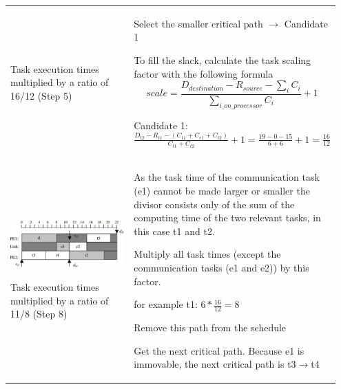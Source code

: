 \begin{longtable}{p{0.4\linewidth}p{0.55\linewidth}}
				Task execution times multiplied by a ratio of 16/12 (Step 5)			
			&
				\begin{compactenum}	
					\setcounter{enumi}{2}
					\item Select the smaller critical path $\rightarrow$ Candidate 1
					\item To fill the slack, calculate the task scaling factor with the following formula 
					\begin{equation*}
						scale=\frac{D_{destination}-R_{source}-\sum_{i}C_i}{\sum_{i\_on\_processor}C_i}+1
					\end{equation*}
					\begin{compactitem}
						\item Candidate 1: $\frac{D_{t2}-R_{t1}-(C_{t1}+C_{e1}+C_{t2})}{C_{t1}+C_{t2}}+1=\frac{19-0-15}{6+6}+1=\frac{16}{12}$
					\end{compactitem}				
				\end{compactenum}\\[-\normalbaselineskip]			
				
			\vspace{0pt}
			
			\includegraphics[scale=0.35]{./pictures/voltage_scheduling_3.png}
			
			Task execution times multiplied by a ratio of 11/8 (Step 8)			
			&
				\begin{compactitem}
					\item[] As the task time of the communication task (e1) cannot be made larger or smaller the divisor consists only of the sum of the computing time of the two relevant tasks, in this case t1 and t2.
				\end{compactitem}
				\begin{compactenum}	
					\setcounter{enumi}{4}
					\item Multiply all task times (except the communication tasks (e1 and e2)) by this factor.
					\begin{compactitem}
						\item for example t1: $6*\frac{16}{12}=8$
					\end{compactitem}
					\item Remove this path from the schedule
					\item Get the next critical path. Because e1 is immovable, the next critical path is t3$\rightarrow$t4								
				\end{compactenum}	\\[-\normalbaselineskip]
			

\end{longtable}
